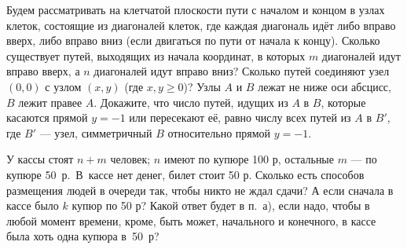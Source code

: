 \documentclass[11pt,a4paper]{article}
\begin{document}





%
%
%
%
%



Будем рассматривать на клетчатой плоскости пути
с началом и концом в узлах клеток,
состоящие из диагоналей клеток, где каждая диагональ
ид\"ет либо вправо вверх, либо вправо вниз (если двигаться по пути
от начала к концу).
 Сколько существует путей, выходящих из начала координат, в которых
$m$ диагоналей идут вправо вверх, а $n$ диагоналей идут вправо вниз?
 Сколько путей соединяют узел $(0,0)$ с узлом $(x,y)$
(где $x,y\geq0$)?
Узлы $A$ и $B$ лежат не ниже оси абсцисс, $B$ лежит правее $A$.
Докажите, что число путей, идущих из $A$ в $B$, которые касаются
прямой $y=-1$ или пересекают е\"е, равно числу всех путей из $A$
в $B'$, где $B'$ --- узел, симметричный $B$ относительно прямой $y=-1$.

У кассы стоят $n+m$ человек; $n$ имеют по купюре 100 р, остальные $m$ ---  по купюре
50~р.~В~кассе нет денег, билет стоит 50 р. Сколько есть способов размещения людей
в очереди так, чтобы никто не ждал сдачи?
 А если сначала в кассе было $k$ купюр по 50 р?
 Какой ответ будет в п.~а), если надо, чтобы в любой момент времени, кроме, быть может, начального и конечного,
в кассе была хоть одна купюра в~50~р?
\end{document}
